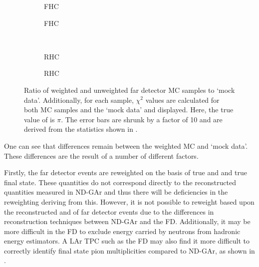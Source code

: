 \begin{figure}[h]
	\begin{subfigure}[t]{.5\linewidth}
		\begin{adjustbox}{max totalsize=\linewidth, center}
			
		\end{adjustbox}
		\caption{FHC \numu}
	\end{subfigure}
	\hfill
	\begin{subfigure}[t]{.5\linewidth}
		\begin{adjustbox}{max totalsize=\linewidth, center}
			
		\end{adjustbox}
		\caption{FHC \nue}
	\end{subfigure} \\
	\begin{subfigure}[t]{.5\linewidth}
		\begin{adjustbox}{max totalsize=\linewidth, center}
			
		\end{adjustbox}
		\caption{RHC \anumu}
	\end{subfigure}
	\hfill
	\begin{subfigure}[t]{.5\linewidth}
		\begin{adjustbox}{max totalsize=\linewidth, center}
			
		\end{adjustbox}
		\caption{RHC \anue}
	\end{subfigure}
	\caption[Ratio of weighted and unweighted far detector MC samples to mock data.]{Ratio of weighted and unweighted far detector MC samples to `mock data'. Additionally, for each sample, $\chi^{2}$ values are calculated for both MC samples and the `mock data' and displayed. Here, the true value of \dcp is $\pi$. The error bars are shrunk by a factor of \num{10} and are derived from the statistics shown in .}
	\label{fig:reweightedSamplesRatio}
\end{figure} 

One can see that differences remain between the weighted MC and `mock data'. 
These differences are the result of a number of different factors.

Firstly, the far detector events are reweighted on the basis of true \evis and \pvis and true final state.
These quantities do not correspond directly to the reconstructed quantities measured in ND-GAr and thus there will be deficiencies in the reweighting deriving from this.
However, it is not possible to reweight based upon the reconstructed \evis and \pvis of far detector events due to the differences in reconstruction techniques between ND-GAr and the FD.
Additionally, it may be more difficult in the FD to exclude energy carried by neutrons from hadronic energy estimators.
A LAr TPC such as the FD may also find it more difficult to correctly identify final state pion multiplicities compared to ND-GAr, as shown in .

